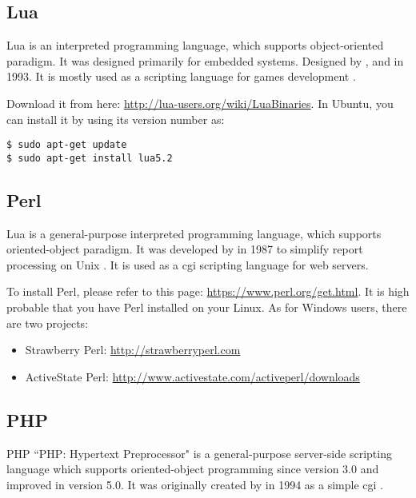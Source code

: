 \documentclass{KodeBookAr}
\begin{document}
\subsection{Lua}


Lua is an interpreted programming language, which supports object-oriented paradigm.
It was designed primarily for embedded systems.
Designed by ,  and  in 1993.
It is mostly used as a scripting language for games development \citep{2018-lua}.

Download it from here: \url{http://lua-users.org/wiki/LuaBinaries}. 
In Ubuntu, you can install it by using its version number as:
\begin{lstlisting}[style=shellStyle]
$ sudo apt-get update
$ sudo apt-get install lua5.2
\end{lstlisting}


\subsection{Perl}


Lua is a general-purpose interpreted programming language, which supports oriented-object paradigm. 
It was developed by  in 1987 to simplify report processing on Unix \citep{2001-ashton}.
It is used as a \ac{cgi} scripting language for web servers.

To install Perl, please refer to this page: \url{https://www.perl.org/get.html}. 
It is high probable that you have Perl installed on your Linux. 
As for Windows users, there are two projects: 
\begin{itemize}
	\item Strawberry Perl: \url{http://strawberryperl.com}
	\item ActiveState Perl: \url{http://www.activestate.com/activeperl/downloads}
\end{itemize}

\subsection{PHP}


PHP ``PHP: Hypertext Preprocessor" is a general-purpose server-side scripting language which supports oriented-object programming since version 3.0  and improved in version 5.0.
It was originally created by  in 1994 as a simple \ac{cgi} \citep{2018-cowburn}. 
\end{document}
